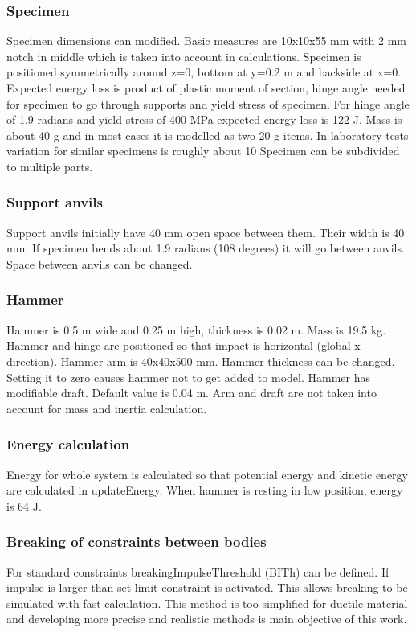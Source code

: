 \subsubsection{Specimen}
Specimen dimensions can modified. Basic measures are 10x10x55 mm with 2 mm notch in middle which is taken into account in calculations. Specimen is positioned symmetrically around z=0, bottom at y=0.2 m and backside at x=0. 
Expected energy loss is product of plastic moment of section, hinge angle needed for specimen to go through supports and 
yield stress of specimen. For hinge angle of 1.9 radians and yield stress of 400 MPa expected energy 
loss is 122 J. Mass is about 40 g and in most cases it is modelled as two 20 g items. In laboratory tests variation for similar 
specimens is roughly about 10 %
Specimen can be subdivided to multiple parts.

\subsubsection{Support anvils}
Support anvils initially have 40 mm open space between them. Their width is 40 mm. 
If specimen bends about 1.9 radians (108 degrees) it will go between anvils. Space between anvils can be changed.

\subsubsection{Hammer}
Hammer is 0.5 m wide and 0.25 m high, thickness is 0.02 m. Mass is 19.5 kg. Hammer and hinge are positioned so that 
impact is horizontal  (global x-direction). Hammer arm is 40x40x500 mm. Hammer thickness can be changed.
Setting it to zero causes hammer not to get added to model. Hammer has modifiable draft. Default value is 0.04 m. 
Arm and draft are not taken into account for mass and inertia calculation.

\subsubsection{Energy calculation}

Energy for whole system is calculated so that potential energy and kinetic energy are calculated in updateEnergy. 
When hammer is resting in low position, energy is 64 J. 

\subsubsection{Breaking of constraints between bodies}
For standard \bullet constraints breakingImpulseThreshold (BITh) can be defined. If impulse is larger than set limit constraint is activated. 
This allows breaking to be simulated with fast calculation. 
This method is too simplified for ductile material and developing more precise and realistic methods is main objective of this work.  


